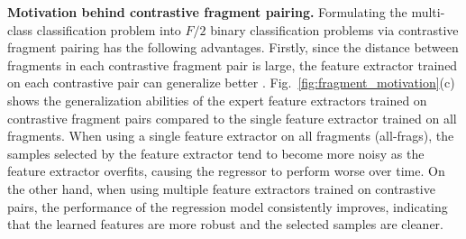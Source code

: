 \documentclass{article}
\theoremstyle{plain}
\theoremstyle{definition}
\theoremstyle{remark}
\begin{document}
\textbf{Motivation behind contrastive fragment pairing. }
Formulating the multi-class classification problem into $F/2$ binary classification problems via contrastive fragment pairing has the following advantages.
Firstly, since the distance between fragments in each contrastive fragment pair is large, the feature extractor trained on each contrastive pair can generalize better \citep{shawe1998robust, gronlund2019margin, gronlund2020near}.
Fig.~\ref{fig:fragment_motivation}(c) shows the generalization abilities of the expert feature extractors trained on contrastive fragment pairs compared to the single feature extractor trained on all fragments.
When using a single feature extractor on all fragments (all-frags), the samples selected by the feature extractor tend to become more noisy as the feature extractor overfits, causing the regressor to perform worse over time.
On the other hand, when using multiple feature extractors trained on contrastive pairs, the performance of the regression model consistently improves, indicating that the learned features are more robust and the selected samples are cleaner.
\end{document}
